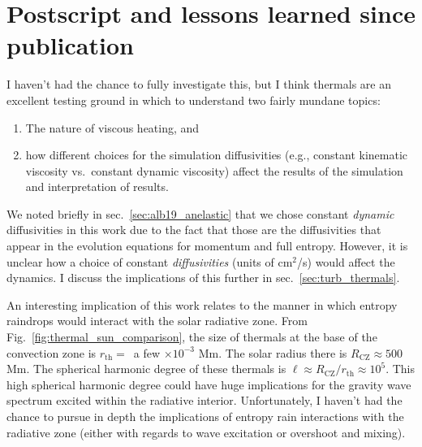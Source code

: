 \section{Postscript and lessons learned since publication}
\label{sec:alb19_postscript}
I haven't had the chance to fully investigate this, but I think thermals are an excellent testing ground in which to understand two fairly mundane topics:
\begin{enumerate}
\item The nature of viscous heating, and
\item how different choices for the simulation diffusivities (e.g., constant kinematic viscosity vs.~constant dynamic viscosity) affect the results of the simulation and interpretation of results.
\end{enumerate}
We noted briefly in sec.~\ref{sec:alb19_anelastic} that we chose constant \emph{dynamic} diffusivities in this work due to the fact that those are the diffusivities that appear in the evolution equations for momentum and full entropy.
However, it is unclear how a choice of constant \emph{diffusivities} (units of cm$^2$/s) would affect the dynamics.
I discuss the implications of this further in sec.~\ref{sec:turb_thermals}.

An interesting implication of this work relates to the manner in which entropy raindrops would interact with the solar radiative zone.
From Fig.~\ref{fig:thermal_sun_comparison}, the size of thermals at the base of the convection zone is $r_{\text{th}} =\,$ a few $\times 10^{-3}$ Mm.
The solar radius there is $R_{\text{CZ}} \approx 500$ Mm.
The spherical harmonic degree of these thermals is $\ell \approx R_{\text{CZ}}/ r_{\text{th}} \approx 10^{5}$.
This high spherical harmonic degree could have huge implications for the gravity wave spectrum excited within the radiative interior.
Unfortunately, I haven't had the chance to pursue in depth the implications of entropy rain interactions with the radiative zone (either with regards to wave excitation or overshoot and mixing).
